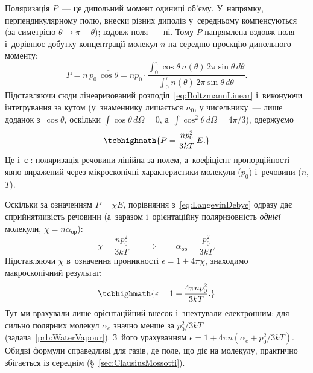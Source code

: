 Поляризація $P$~--- це дипольний момент одиниці об'єму. У~напрямку, перпендикулярному
полю, внески різних диполів у~середньому компенсуються (за симетрією
$\theta\to\pi-\theta$); вздовж поля~--- ні. Тому $P$ напрямлена вздовж поля і~дорівнює
добутку концентрації молекул $n$ на середню проєкцію дипольного моменту:
\begin{equation*}
	P = n\, p_0\, \overline{\cos\theta} = n p_0 \cdot \frac{\displaystyle\int_0^\pi \cos\theta \, n(\theta)\, 2\pi\sin\theta\, d\theta}
	{\displaystyle\int_0^\pi n(\theta)\, 2\pi\sin\theta\, d\theta}.
\end{equation*}
Підставляючи сюди лінеаризований розподіл~\eqref{eq:BoltzmannLinear} і~виконуючи
інтегрування за кутом (у~знаменнику лишається $n_0$, у чисельнику~--- лише доданок
з~$\cos\theta$, оскільки $\int\cos\theta\,d\Omega=0$, а~$\int\cos^2\theta\,d\Omega =
	4\pi/3$), одержуємо
\begin{equation}\label{eq:LangevinDebye}
	\tcbhighmath{
		P = \frac{n p_0^2}{3kT}\, E.
	}
\end{equation}
Це і~є : поляризація речовини лінійна за полем, а~коефіцієнт
пропорційності явно виражений через мікроскопічні характеристики молекули ($p_0$)
і~речовини ($n$, $T$).

Оскільки за означенням $P = \chi E$, порівняння з~\eqref{eq:LangevinDebye} одразу дає
сприйнятливість речовини (а~заразом і~орієнтаційну поляризовність \emph{однієї} молекули,
$\chi = n\alpha_\text{ор}$):
\begin{equation*}
	\chi = \frac{n p_0^2}{3kT}
	\qquad\Longrightarrow\qquad
	\alpha_\text{ор} = \frac{p_0^2}{3kT}.
\end{equation*}
Підставляючи $\chi$ в~означення проникності $\epsilon = 1+4\pi\chi$, знаходимо
макроскопічний результат:
\begin{equation}\label{eq:CurieLaw}
	\tcbhighmath{
		\epsilon = 1 + \frac{4\pi n p_0^2}{3kT}.
	}
\end{equation}
Тут ми врахували лише орієнтаційний внесок і~знехтували електронним: для сильно полярних
молекул $\alpha_e$ значно менше за $p_0^2/3kT$ (задача~\ref{prb:WaterVapour}). З~його
урахуванням $\epsilon = 1 + 4\pi n\left(\alpha_e + p_0^2/3kT\right)$. Обидві формули
справедливі для газів, де поле, що діє на молекулу, практично збігається із середнім
(\S~\ref{sec:ClausiusMossotti}).

